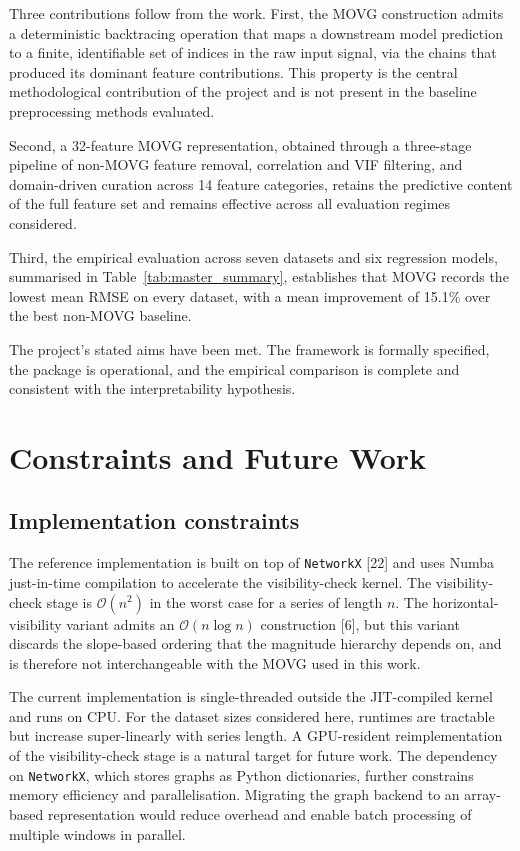 \documentclass[a4paper,12pt]{article}
\begin{document}
Three contributions follow from the work. First, the MOVG construction admits a deterministic backtracing operation that maps a downstream model prediction to a finite, identifiable set of indices in the raw input signal, via the chains that produced its dominant feature contributions. This property is the central methodological contribution of the project and is not present in the baseline preprocessing methods evaluated.

Second, a 32-feature MOVG representation, obtained through a three-stage pipeline of non-MOVG feature removal, correlation and VIF filtering, and domain-driven curation across 14 feature categories, retains the predictive content of the full feature set and remains effective across all evaluation regimes considered.

Third, the empirical evaluation across seven datasets and six regression models, summarised in Table~\ref{tab:master_summary}, establishes that MOVG records the lowest mean RMSE on every dataset, with a mean improvement of 15.1\% over the best non-MOVG baseline.

The project's stated aims have been met. The framework is formally specified, the package is operational, and the empirical comparison is complete and consistent with the interpretability hypothesis.

\section{Constraints and Future Work}
\label{sec:constraints}

\subsection{Implementation constraints}
\label{sec:constr_impl}

The reference implementation is built on top of \texttt{NetworkX} [22] and uses Numba just-in-time compilation to accelerate the visibility-check kernel. The visibility-check stage is $\mathcal{O}(n^{2})$ in the worst case for a series of length $n$. The horizontal-visibility variant admits an $\mathcal{O}(n \log n)$ construction [6], but this variant discards the slope-based ordering that the magnitude hierarchy depends on, and is therefore not interchangeable with the MOVG used in this work.

The current implementation is single-threaded outside the JIT-compiled kernel and runs on CPU. For the dataset sizes considered here, runtimes are tractable but increase super-linearly with series length. A GPU-resident reimplementation of the visibility-check stage is a natural target for future work. The dependency on \texttt{NetworkX}, which stores graphs as Python dictionaries, further constrains memory efficiency and parallelisation. Migrating the graph backend to an array-based representation would reduce overhead and enable batch processing of multiple windows in parallel.
\end{document}
